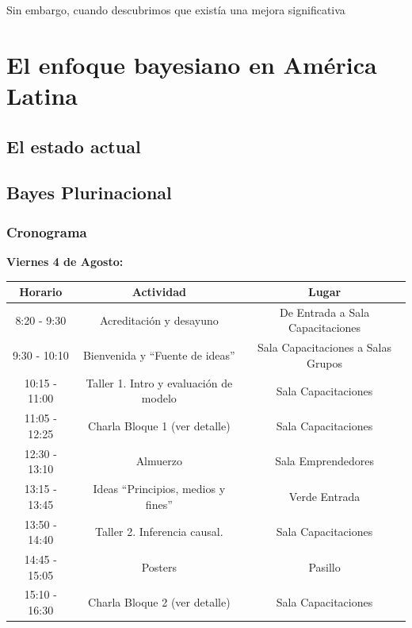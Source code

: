 \documentclass[a4paper,11pt]{book}
\theoremstyle{definition}
\begin{document}

Sin embargo, cuando descubrimos que existía una mejora significativa

\section{El enfoque bayesiano en América Latina} \label{sec:bayesplurinacional}


\subsection{El estado actual}



\subsection{Bayes Plurinacional}


\subsubsection{Cronograma}

\begin{table}[ht!]
\textbf{Viernes 4 de Agosto:}  \\[-0.2cm]

\centering \small
\begin{tabular}{ccc}
\hline
\rowcolor{gray!20} \textbf{Horario} &  \hspace{2.1cm} \textbf{Actividad} \hspace{2.1cm}  &  \phantom{.}\hspace{2.1cm} \textbf{Lugar} \hspace{2.1cm} \\
\hline \hline
 8:20 - 9:30 & Acreditación y desayuno & De Entrada a Sala Capacitaciones \\
\hline
\rowcolor{gray!10}
9:30 - 10:10 & Bienvenida y ``Fuente de ideas'' & Sala Capacitaciones a Salas Grupos \\
\hline
10:15 - 11:00 & Taller 1. Intro y evaluación de modelo & Sala Capacitaciones \\
\hline
\rowcolor{gray!10}
11:05 - 12:25 & Charla Bloque 1 (ver detalle) & Sala Capacitaciones \\
\hline
\hline
 12:30 - 13:10 & Almuerzo & Sala Emprendedores \\
 13:15 - 13:45 & Ideas ``Principios, medios y fines'' & Verde Entrada \\
\hline
\hline
\rowcolor{gray!10}
13:50 - 14:40 & Taller 2. Inferencia causal. & Sala Capacitaciones \\
\hline
14:45 - 15:05 & Posters & Pasillo \\
\hline
\rowcolor{gray!10}
15:10 - 16:30 & Charla Bloque 2 (ver detalle) & Sala Capacitaciones \\
\hline

\end{tabular}
\end{table}
\end{document}
